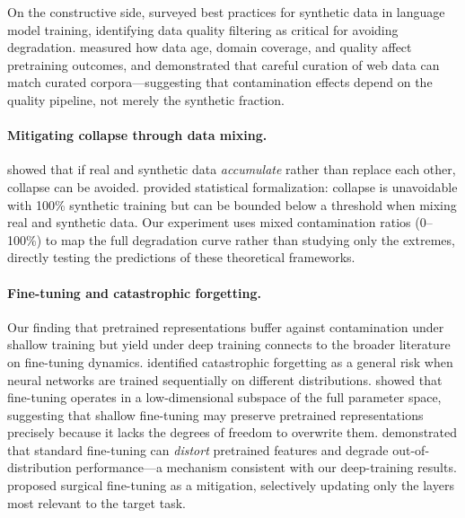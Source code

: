 \documentclass{article}
\begin{document}
On the constructive side, \citet{liu2024best} surveyed best practices for synthetic data in language model training, identifying data quality filtering as critical for avoiding degradation.
\citet{longpre2023pretrainers} measured how data age, domain coverage, and quality affect pretraining outcomes, and \citet{penedo2023refinedweb} demonstrated that careful curation of web data can match curated corpora---suggesting that contamination effects depend on the quality pipeline, not merely the synthetic fraction.

\paragraph{Mitigating collapse through data mixing.}
\citet{gerstgrasser2024model} showed that if real and synthetic data \emph{accumulate} rather than replace each other, collapse can be avoided.
\citet{dohmatob2024tale} provided statistical formalization: collapse is unavoidable with 100\% synthetic training but can be bounded below a threshold when mixing real and synthetic data.
Our experiment uses mixed contamination ratios (0--100\%) to map the full degradation curve rather than studying only the extremes, directly testing the predictions of these theoretical frameworks.

\paragraph{Fine-tuning and catastrophic forgetting.}
Our finding that pretrained representations buffer against contamination under shallow training but yield under deep training connects to the broader literature on fine-tuning dynamics.
\citet{kirkpatrick2017overcoming} identified catastrophic forgetting as a general risk when neural networks are trained sequentially on different distributions.
\citet{aghajanyan2021intrinsic} showed that fine-tuning operates in a low-dimensional subspace of the full parameter space, suggesting that shallow fine-tuning may preserve pretrained representations precisely because it lacks the degrees of freedom to overwrite them.
\citet{kumar2022finetuning} demonstrated that standard fine-tuning can \emph{distort} pretrained features and degrade out-of-distribution performance---a mechanism consistent with our deep-training results.
\citet{lee2022surgical} proposed surgical fine-tuning as a mitigation, selectively updating only the layers most relevant to the target task.
\end{document}
